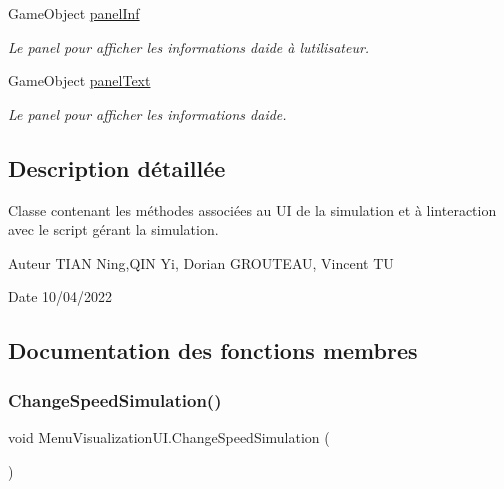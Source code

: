 \begin{DoxyCompactItemize}
Game\+Object \mbox{\hyperlink{class_menu_visualization_u_i_ac04938fb4312a4f1c2f920a3eb4f7724}{panel\+Inf}}
\begin{DoxyCompactList}\small\item\em Le panel pour afficher les informations d\textquotesingle{}aide à l\textquotesingle{}utilisateur. \end{DoxyCompactList}\item 
Game\+Object \mbox{\hyperlink{class_menu_visualization_u_i_afb3f0b8c1a97e54dc40514db77041fcf}{panel\+Text}}
\begin{DoxyCompactList}\small\item\em Le panel pour afficher les informations d\textquotesingle{}aide. \end{DoxyCompactList}\end{DoxyCompactItemize}


\subsection{Description détaillée}
Classe contenant les méthodes associées au UI de la simulation et à l\textquotesingle{}interaction avec le script gérant la simulation. 

\begin{DoxyAuthor}{Auteur}
T\+I\+AN Ning,Q\+IN Yi, Dorian G\+R\+O\+U\+T\+E\+AU, Vincent TU 
\end{DoxyAuthor}
\begin{DoxyDate}{Date}
10/04/2022 
\end{DoxyDate}


\subsection{Documentation des fonctions membres}
\mbox{\label{class_menu_visualization_u_i_abae4f4813543053bd5fc9d68ed4916d5}} 
\subsubsection{\texorpdfstring{Change\+Speed\+Simulation()}{ChangeSpeedSimulation()}}
{\footnotesize\ttfamily void Menu\+Visualization\+U\+I.\+Change\+Speed\+Simulation (\begin{DoxyParamCaption}{ }\end{DoxyParamCaption})\hspace{0.3cm}{\ttfamily [inline]}}



